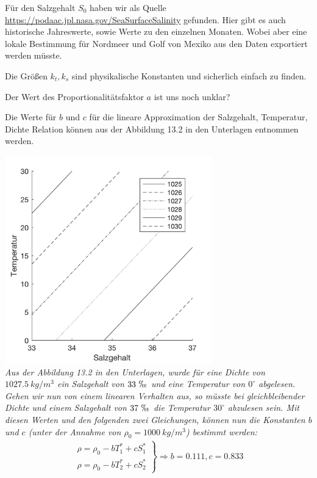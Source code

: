 \documentclass[10pt,a4paper]{article}
\begin{document}
	Für den Salzgehalt \(S_0\) haben wir als Quelle \url{https://podaac.jpl.nasa.gov/SeaSurfaceSalinity} gefunden. Hier gibt es auch historische Jahreswerte, sowie Werte zu den einzelnen Monaten. Wobei aber eine lokale Bestimmung für Nordmeer und Golf von Mexiko aus den Daten exportiert werden müsste.
	
	Die Größen \(k_t, k_s\) sind physikalische Konstanten und sicherlich einfach zu finden.
	
	Der Wert des Proportionalitätsfaktor \(a\) ist uns noch unklar?
	
	Die Werte für \(b\) und \(c\) für die lineare Approximation der Salzgehalt, Temperatur, Dichte Relation können aus der Abbildung 13.2 in den Unterlagen entnommen werden.
	
	\begin{center}
	\includegraphics[width=9cm]{Diagramme/salz_temp_dichte.png} \\
	\textit{Aus der Abbildung 13.2 in den Unterlagen, wurde für eine Dichte von \(1027.5~kg/m^3\) ein Salzgehalt von \(33~\permil\) und eine Temperatur von \(0^\circ\) abgelesen. Gehen wir nun von einem linearen Verhalten aus, so müsste bei gleichbleibender Dichte und einem Salzgehalt von \(37~\permil\) die Temperatur \(30^\circ\) abzulesen sein. Mit diesen Werten und den folgenden zwei Gleichungen, können nun die Konstanten \(b\) und \(c\) (unter der Annahme von \(\rho_0 = 1000~kg/m^3\)) bestimmt werden:}
	\begin{align*}
		\left. \begin{array}{ll}
			\rho = \rho_0 - b T^*_1 + c S^*_1 \\
			\rho = \rho_0 - b T^*_2 + c S^*_2
		\end{array} \right\}
		\Rightarrow b = 0.111, c = 0.833
	\end{align*}
	\end{center}	
	
\end{document}
